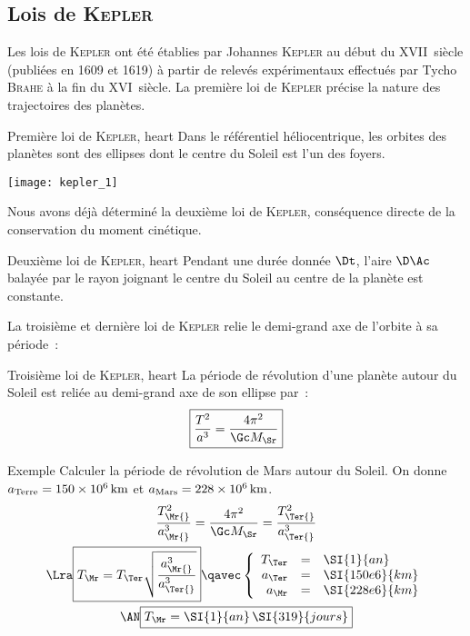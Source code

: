 \documentclass[../main/main.tex]{subfiles}
\begin{document}
\subsection{Lois de \textsc{Kepler}}
Les lois de \textsc{Kepler} ont été établies par Johannes \textsc{Kepler} au
début du \textsc{XVII}\ieme\ siècle (publiées en 1609 et 1619) à partir de
relevés expérimentaux effectués par Tycho \textsc{Brahe} à la fin du
\textsc{XVI}\ieme\ siècle. \bigbreak
La première loi de \textsc{Kepler} précise la nature des trajectoires des
planètes.
\begin{tprop}{Première loi de \textsc{Kepler}, heart}
    \centering
    Dans le référentiel héliocentrique, les orbites des planètes sont des
    ellipses dont le centre du Soleil est l'un des foyers.
    \begin{center}
        \texttt{[image: kepler\_1]}
    \end{center}
\end{tprop}

Nous avons déjà déterminé la deuxième loi de \textsc{Kepler}, conséquence
directe de la conservation du moment cinétique.

\begin{tprop}{Deuxième loi de \textsc{Kepler}, heart}
    Pendant une durée donnée $\Dt$, l'aire $\D\Ac$ balayée par le rayon joignant
    le centre du Soleil au centre de la planète est constante.
\end{tprop}

La troisième et dernière loi de \textsc{Kepler} relie le demi-grand axe de
l'orbite à sa période~:
\begin{tprop}{Troisième loi de \textsc{Kepler}, heart}
    La période de révolution d'une planète autour du Soleil est reliée au
    demi-grand axe de son ellipse par~:
    \[\boxed{\frac{T^2}{a^3} = \frac{4\pi^2}{\Gc M_\Sr}}\]
\end{tprop}
\begin{rexem}{Exemple}
    Calculer la période de révolution de Mars autour du Soleil. On donne $a_{\rm
    Terre} = \SI{150e6}{km}$ et $a_{\rm Mars} = \SI{228e6}{km}$.
    \tcblower
    \begin{gather*}
        \frac{T_\Mr{}^2}{a_\Mr{}^3} =
        \frac{4\pi^2}{\Gc M_\Sr} =
        \frac{T_\Ter{}^2}{a_\Ter{}^3} 
        \\\Lra
        \boxed{T_\Mr = T_\Ter \sqrt{\frac{a_\Mr{}^3}{a_\Ter{}^3}}}
        \qavec
        \left\{
            \begin{array}{rcl}
                T_\Ter & = & \SI{1}{an}\\
                a_\Ter & = & \SI{150e6}{km}\\
                a_\Mr & = & \SI{228e6}{km}
            \end{array}
        \right.
        \\\AN
        \boxed{T_\Mr = \SI{1}{an}\,\SI{319}{jours}}
    \end{gather*}
\end{rexem}
\end{document}
